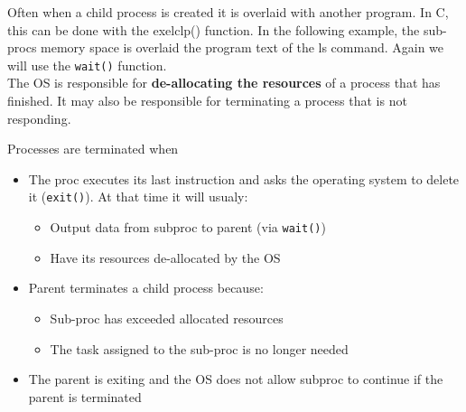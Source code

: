 \documentclass[a4paper, 10pt]{article}
\begin{document}
Often when a child process is created it is overlaid with another program. In C, this can be done with the {exelclp()} function. In the following example, the sub-procs memory space is overlaid the program text of the ls command.  Again we will use the \texttt{wait()} function.\\[2ex]
The OS is responsible for \textbf{de-allocating the resources} of a process that has finished. It may also be responsible for terminating a process that is not responding.
\begin{conceptbox}{Processes are terminated when}{}
    \begin{itemize}
        \item The proc executes its last instruction and asks the operating system to delete it (\texttt{exit()}). At that time it will usualy:
              \begin{itemize}
                  \item Output data from subproc to parent (via \texttt{wait()})
                  \item Have its resources de-allocated by the OS
              \end{itemize}
        \item Parent terminates a child process because:
              \begin{itemize}
                  \item Sub-proc has exceeded allocated resources
                  \item The task assigned to the sub-proc is no longer needed
              \end{itemize}
        \item The parent is exiting and the OS does not allow subproc to continue if the parent is terminated
    \end{itemize}
\end{conceptbox}
\end{document}
